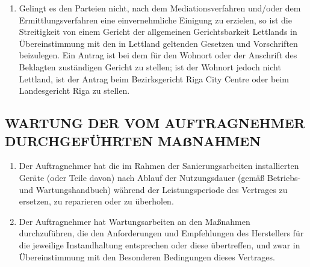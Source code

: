 \begin{multicols}{2}
\begin{enumerate}
   \item Gelingt es den Parteien nicht, nach dem Mediationsverfahren und/oder dem Ermittlungsverfahren eine einvernehmliche Einigung zu erzielen, so ist die Streitigkeit von einem Gericht der allgemeinen Gerichtsbarkeit Lettlands in Übereinstimmung mit den in Lettland geltenden Gesetzen und Vorschriften beizulegen. Ein Antrag ist bei dem für den Wohnort oder der Anschrift des Beklagten zuständigen Gericht zu stellen; ist der Wohnort jedoch nicht Lettland, ist der Antrag beim Bezirksgericht Riga City Centre oder beim Landesgericht Riga zu stellen.
\end{enumerate}

  \subsection{WARTUNG DER VOM AUFTRAGNEHMER DURCHGEFÜHRTEN MAẞNAHMEN}
   \begin{enumerate}
  \item Der Auftragnehmer hat die im Rahmen der Sanierungsarbeiten installierten Geräte (oder Teile davon) nach Ablauf der Nutzungsdauer (gemäß Betriebs- und Wartungshandbuch) während der Leistungsperiode des Vertrages zu ersetzen, zu reparieren oder zu überholen.
  \item Der Auftragnehmer hat Wartungsarbeiten an den Maßnahmen durchzuführen, die den Anforderungen und Empfehlungen des Herstellers für die jeweilige Instandhaltung entsprechen oder diese übertreffen, und zwar in Übereinstimmung mit den Besonderen Bedingungen dieses Vertrages.
  \end{enumerate}


\end{multicols}

